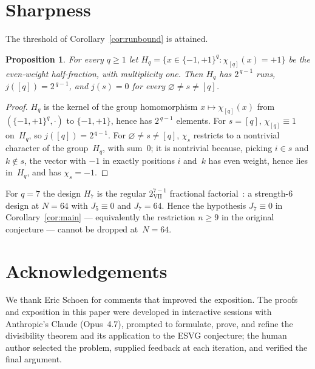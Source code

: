 \documentclass[11pt]{article}
\newtheorem{proposition}[theorem]{Proposition}
\theoremstyle{definition}
\newcommand{\Fpm}{\{-1,+1\}}
\newcommand{\jc}{j}
\begin{document}
\section{Sharpness}

The threshold of Corollary~\ref{cor:runbound} is attained.

\begin{proposition}\label{prop:sharp}
For every $q\ge 1$ let $H_q=\{x\in\Fpm^q:\chi_{[q]}(x)=+1\}$ be the
even-weight half-fraction, with multiplicity one. Then $H_q$ has $2^{\,q-1}$
runs, $\jc([q])=2^{\,q-1}$, and $\jc(s)=0$ for every
$\varnothing\ne s\ne[q]$.
\end{proposition}

\begin{proof}
$H_q$ is the kernel of the group homomorphism $x\mapsto\chi_{[q]}(x)$ from
$(\Fpm^q,\cdot)$ to $\Fpm$, hence has $2^{\,q-1}$ elements. For $s=[q]$,
$\chi_{[q]}\equiv 1$ on~$H_q$, so $\jc([q])=2^{\,q-1}$. For
$\varnothing\ne s\ne[q]$, $\chi_s$ restricts to a nontrivial character of
the group~$H_q$, with sum~$0$; it is nontrivial because, picking $i\in s$
and $k\notin s$, the vector with $-1$ in exactly positions $i$ and~$k$ has
even weight, hence lies in~$H_q$, and has $\chi_s=-1$.
\end{proof}

For $q=7$ the design $H_7$ is the regular $2^{7-1}_{\mathrm{VII}}$ fractional
factorial~\cite{BoxHunter1961,BoxHunterHunter2005}: a strength-$6$ design at $N=64$ with $J_5\equiv 0$ and $J_7=64$.
Hence the hypothesis $J_7\equiv 0$ in Corollary~\ref{cor:main} --- equivalently
the restriction $n\ge 9$ in the original conjecture --- cannot be dropped
at~$N=64$.

\section*{Acknowledgements}

We thank Eric Schoen for comments that improved the exposition. The proofs and
exposition in this paper were developed in interactive sessions with
Anthropic's Claude (Opus~4.7), prompted to formulate, prove, and refine the
divisibility theorem and its application to the ESVG conjecture; the human
author selected the problem, supplied feedback at each iteration, and verified
the final argument.
\end{document}
